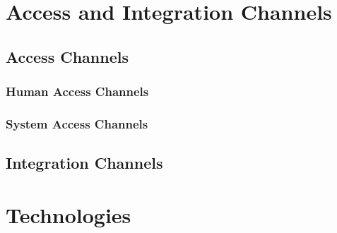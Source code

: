 \documentclass[a4paper,12pt,titlepage]{article}
\begin{document}
\section{Access and Integration Channels}
\subsection{Access Channels}
\subsubsection{Human Access Channels}%

\subsubsection{System Access Channels}%
	
\subsection{Integration Channels}%
	
\newpage
\section{Technologies}%

\end{document}
